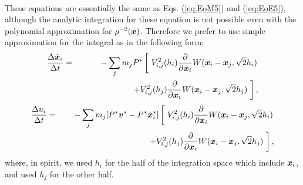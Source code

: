 \documentclass{cjour}
\newcommand{ \Vec   }[1]{ \mbox{\boldmath $ #1 $} }
\newcommand{ \PD    }[2]{ \frac{ \partial #1 }{ \partial #2 } }
\begin{document}
\begin{article}
\begin{eqnarray}
                                                    \label{eq:EoE6}
\end{eqnarray}
These equations are essentially the same as Eqs. 
(\ref{eq:EoM5}) and (\ref{eq:EoE5}),   
although the analytic integration for these equation is not possible 
even with the polynomial approximation for $\rho^{-2}(\Vec{x})$. 
Therefore we prefer to use simple approximation for the integral 
as in the following form: 
\begin{eqnarray}
             \frac{\Delta \dot{\Vec{x}}_i}{\Delta t} 
       & = &
              -   \sum_{j} m_j P^*
           \left[ ~
             V^2_{i,j} (h_i) 
             \PD{}{\Vec{x}_i} W(\Vec{x}_i-\Vec{x}_j, \sqrt{2}h_i)
           \right.
                                                        \nonumber \\
       &   & ~~~~~~~~~~~~~~~~~~~
           \left.
           + V^2_{i,j} (h_j) 
             \PD{}{\Vec{x}_i} W(\Vec{x}_i-\Vec{x}_j, \sqrt{2}h_j) ~
           \right] ,   
                                                     \label{eq:EoM6.5}
\end{eqnarray}
%
\begin{eqnarray}
                \frac{\Delta u_i}{\Delta t} 
       & = & - \sum_j m_j [ P^*\Vec{v}^* - P^* \dot{\Vec{x}}_i^* ] 
           \left[ ~
             V^2_{i,j} (h_i) 
             \PD{}{\Vec{x}_i} W(\Vec{x}_i-\Vec{x}_j, \sqrt{2}h_i)
           \right.
                                                        \nonumber \\
       &   & ~~~~~~~~~~~~~~~~~~~~~~~~~~~~~~~  
           \left.
           + V^2_{i,j} (h_j) 
             \PD{}{\Vec{x}_i} W(\Vec{x}_i-\Vec{x}_j, \sqrt{2}h_j) ~
           \right] ,   
                                                     \label{eq:EoE6.5}
\end{eqnarray}
where, in spirit, 
we used $h_i$ for the half of the integration space which 
include $\Vec{x}_i$, and used $h_j$ for the other half. 


\end{article}
\end{document}
